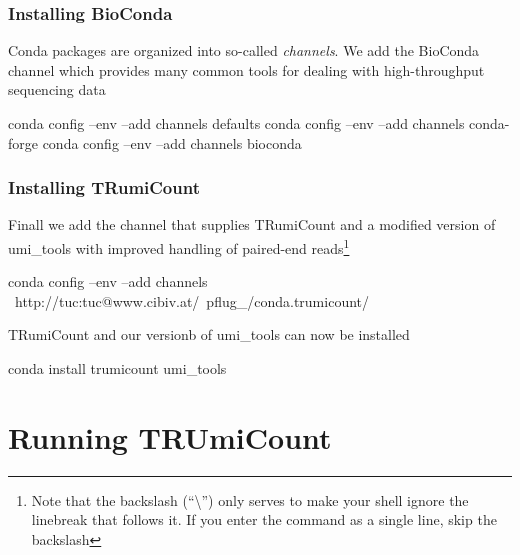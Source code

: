 \documentclass[10pt]{article}
\begin{document}
\subsubsection*{Installing BioConda}

Conda packages are organized into so-called \emph{channels}. We add the BioConda channel which provides many common tools for dealing with high-throughput sequencing data

\begin{shellcode}
conda config --env --add channels defaults
conda config --env --add channels conda-forge
conda config --env --add channels bioconda
\end{shellcode}

\subsubsection*{Installing TRumiCount}

Finall we add the channel that supplies TRumiCount and a modified version of umi\_tools with improved handling of paired-end reads\footnote{Note that the backslash (``\textbackslash'') only serves to make your shell ignore the linebreak that follows it. If you enter the command as a single line, skip the backslash}

\begin{shellcode}
conda config --env --add channels \
  http://tuc:tuc@www.cibiv.at/~pflug_/conda.trumicount/
\end{shellcode}

TRumiCount and our versionb of umi\_tools can now be installed

\begin{shellcode}
conda install trumicount umi_tools
\end{shellcode}

\section{Running TRUmiCount}
\end{document}
